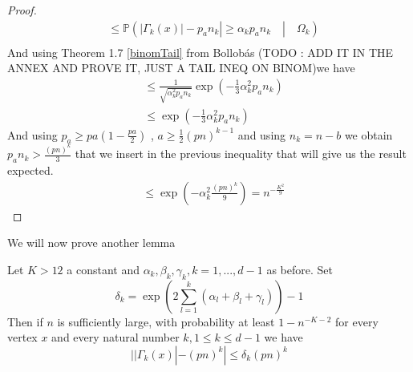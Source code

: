 \begin{proof}
\begin{align}
		&\leq \mathbb{P}(|\Gamma_k(x)| - p_an_k| \geq \alpha_k p_an_k \quad|\quad \Omega_k)\\
	\end{align}
	And using Theorem 1.7 \eqref{binomTail} from Bollob\'as (TODO : ADD IT IN THE ANNEX AND PROVE IT, JUST A TAIL INEQ ON BINOM)we have
	\begin{align}
		&\leq \frac{1}{\sqrt{\alpha_k^2p_an_k}}\exp(-\frac{1}{3}\alpha_k^2p_an_k) \\
		&\leq \exp(-\frac{1}{3}\alpha_k^2p_an_k)
	\end{align}
	And using $p_a \geq pa(1-\frac{pa}{2})$ , $a \geq \frac{1}{2}(pn)^{k-1}$ and using $n_k = n-b$ we obtain $p_an_k > \frac{(pn)^k}{3}$ that we insert in the previous inequality that will give us the result expected.
	\begin{align}
		&\leq \exp(-\alpha_k^2\frac{(pn)^k}{9}) = n^{-\frac{K^2}{9}}
	\end{align}
\end{proof}
We will now prove another lemma
\begin{lemma}\label{th:KLemma}
	Let $K > 12$ a constant and $\alpha_k, \beta_k, \gamma_k, k=1,...,d-1$ as before.
	\newline
	Set 
	\begin{equation}
		\delta_k = \exp(2\sum_{l=1}^{k}(\alpha_l + \beta_l +\gamma_l)) - 1
	\end{equation}
	Then if $n$ is sufficiently large, with probability at least $1-n^{-K-2}$ for every vertex $x$ and every natural number $k, 1\leq k \leq d-1$ we have
	\begin{equation}
		||\Gamma_k(x)| - (pn)^k| \leq \delta_k(pn)^k
	\end{equation}
\end{lemma}

